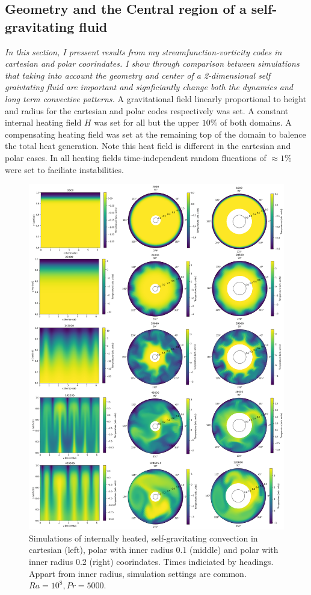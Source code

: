 \documentclass{article}
\begin{document}
\subsection*{Geometry and the Central region of a self-gravitating fluid}
{\it{In this section, I pressent results from my streamfunction-vorticity codes in cartesian and polar coorindates. I show through comparison between simulations that taking into account the geometry and center of a 2-dimensional self graivtating fluid are important and signficiantly change both the dynamics and long term convective patterns.}}
\newline
\vspace{0.3cm}
A gravitational field linearly proportional to height and radius for the 
cartesian and polar codes respectively was set. A constant internal 
heating field $H$ was set for all but the upper $10 \%$ of both domains. A 
compensating heating field was set at the remaining top of the domain to 
balence the total heat generation. Note this heat field is different in 
the cartesian and polar cases. In all heating fields time-independent 
random flucations of $\approx 1 \%$ were set to faciliate instabilities.
\begin{figure}[h!]
	\centering
	\includegraphics{streamfunctionComp.png}
	\caption{Simulations of internally heated, self-gravitating convection in cartesian (left), polar with inner radius 0.1 (middle) and polar with inner radius 0.2 (right) coorindates. Times indiciated by headings. Appart from inner radius, simulation settings are common. $Ra=10^8, Pr=5000$.}
	\label{cartesian vs polar}
\end{figure}
\end{document}
